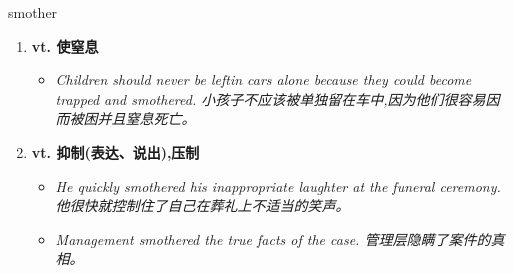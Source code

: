 
\begin{frame}
{\huge smother}
\begin{center}
\begin{enumerate}\Large
  \item \textbf{vt. 使窒息}
  \begin{itemize}
    \item \em{\Large{Children should never be leftin cars alone because they could become trapped and smothered. 小孩子不应该被单独留在车中,因为他们很容易因而被困并且窒息死亡。}}
  \end{itemize}
  \item \textbf{vt. 抑制(表达、说出),压制}
  \begin{itemize}
    \item \em{\Large{He quickly smothered his inappropriate laughter at the funeral ceremony. 他很快就控制住了自己在葬礼上不适当的笑声。}}
    \item \em{\Large{Management smothered the true facts of the case. 管理层隐瞒了案件的真相。}}
  \end{itemize}
\end{enumerate}
\end{center}
\end{frame}
